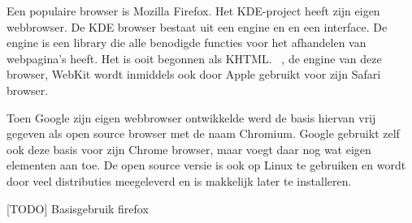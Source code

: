 Een populaire browser is Mozilla Firefox. Het KDE-project heeft zijn eigen webbrowser. De KDE browser bestaat uit een engine
en en een interface. De engine is een library die alle benodigde functies voor het afhandelen van webpagina's heeft.
Het is ooit begonnen als KHTML. \ , de engine van deze browser,
WebKit wordt inmiddels ook door Apple gebruikt voor
zijn Safari browser.

Toen Google zijn eigen webbrowser ontwikkelde werd de basis hiervan vrij gegeven als open source
browser met de naam Chromium. Google gebruikt zelf
ook deze basis voor zijn Chrome browser, maar voegt daar nog wat eigen elementen aan toe. De open source versie is ook
op Linux te gebruiken en wordt door veel distributies meegeleverd en is makkelijk later te installeren.

[TODO] Basisgebruik firefox


